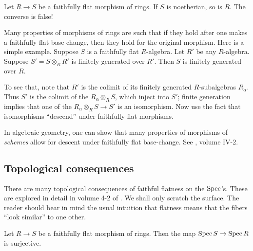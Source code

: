 \begin{exercise} 
Let $R \to S$ be a faithfully flat morphism of rings. If $S$ is noetherian, so
is $R$. The converse is false!
\end{exercise} 


\begin{exercise} Many properties of morphisms of rings are such that if they hold after
one makes a faithfully flat base change, then they hold for the original
morphism.
Here is a simple example.
Suppose $S$ is a faithfully flat $R$-algebra. Let $R'$ be any $R$-algebra.
Suppose $S'  =S \otimes_R R'$ is finitely generated over $R'$. Then $S$ is
finitely generated over $R$. 

To see that, note that $R'$ is the colimit of its finitely generated
$R$-subalgebras $R_\alpha$. Thus $S'$ is the colimit of the $R_\alpha
\otimes_R S$, which inject into $S'$; finite generation implies that one of
the $R_\alpha \otimes_R S \to S'$ is an isomorphism. Now use the fact that
isomorphisms ``descend'' under faithfully flat morphisms.

In algebraic geometry, one can show that many properties of morphisms of
\emph{schemes} allow for descent under faithfully flat base-change. See
\cite{EGA}, volume IV-2.
\end{exercise} 


\subsection{Topological consequences}

There are many topological consequences of faithful flatness on the $\operatorname{Spec}$'s.
These are
explored in detail in volume 4-2 of \cite{EGA}. We shall only scratch the
surface.
The reader 
should bear in mind the usual intuition that flatness means that the fibers
``look similar'' to one other. 

\begin{proposition} 
Let $R \to S$ be a faithfully flat morphism of rings. Then the map $\operatorname{Spec} S
\to \operatorname{Spec} R$ is surjective.
\end{proposition} 

